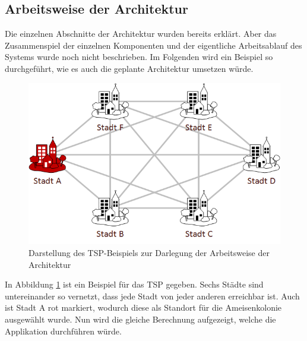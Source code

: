 \subsection{Arbeitsweise der Architektur}
\label{numerschiesBeispiel}
	Die einzelnen Abschnitte der Architektur wurden bereits erklärt. Aber das Zusammenspiel der einzelnen Komponenten und der eigentliche Arbeitsablauf des Systems wurde noch nicht beschrieben. Im Folgenden wird ein Beispiel so durchgeführt, wie es auch die geplante Architektur umsetzen würde.
	\begin{figure}[H]
		\centering
		\includegraphics[width=0.5\linewidth]{images/TSP_ACO_numerisch.png}
		\caption{Darstellung des \ac{TSP}-Beispiels zur Darlegung der Arbeitsweise der Architektur}
		\label{tspAcoNumerisch}
	\end{figure}
	In Abbildung \ref{tspAcoNumerisch} ist ein Beispiel für das \ac{TSP} gegeben. Sechs Städte sind untereinander so vernetzt, dass jede Stadt von jeder anderen erreichbar ist. Auch ist Stadt A rot markiert, wodurch diese als Standort für die Ameisenkolonie ausgewählt wurde. Nun wird die gleiche Berechnung aufgezeigt, welche die Applikation durchführen würde.

